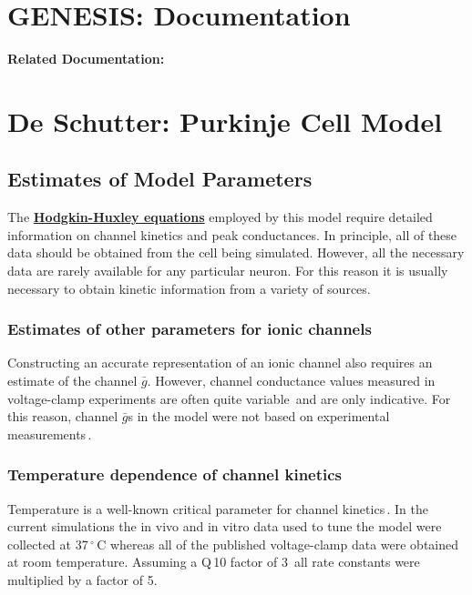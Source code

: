 \documentclass[12pt]{article}
\begin{document}
\section*{GENESIS: Documentation}

{\bf Related Documentation:}

\section*{De Schutter: Purkinje Cell Model}

\subsection*{Estimates of Model Parameters}

The \href{../pub-purkinje-deschutter1-equations/pub-purkinje-deschutter1-equations.tex}{\bf Hodgkin-Huxley equations} employed by this model require detailed information on channel kinetics and peak conductances. In principle,
all of these data should be obtained from the cell being simulated.
However, all the necessary data are rarely available for any
particular neuron. For this reason it is usually necessary to obtain
kinetic information from a variety of sources.

\subsubsection*{Estimates of other parameters for ionic channels}

Constructing an accurate
representation of an ionic channel also requires an estimate of
the channel $\bar g$. However, channel conductance values measured in
voltage-clamp experiments are often quite variable\,\cite{McCormick:1992fk} and are only indicative. For this reason,
channel $\bar g$s in the model were not based on experimental measurements\,\cite{S:1993dz, De-Schutter-E:1993fu}.

\subsubsection*{Temperature dependence of channel kinetics}

Temperature is a well-known critical parameter for channel kinetics\,\cite{Hille:1991zr}.
In the current simulations the in vivo and in vitro data
used to tune the model were collected at 37\,$^\circ$\,C whereas all of the
published voltage-clamp data were obtained at room temperature.
Assuming a Q\,10 factor of 3\,\cite{L:1952fv} all rate constants were multiplied by a factor of 5.
\end{document}
